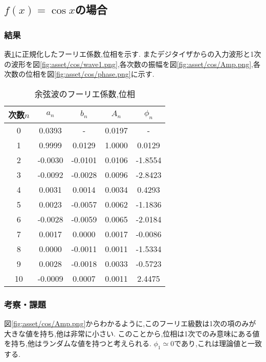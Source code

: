 \subsection{$f(x)=\cos x$の場合}
\subsubsection{結果}
表\ref{tab:cos_res}に正規化したフーリエ係数,位相を示す.
またデジタイザからの入力波形と1次の波形を図\ref{fig:asset/cos/wave1.png},各次数の振幅を図\ref{fig:asset/cos/Amp.png},各次数の位相を図\ref{fig:asset/cos/phase.png}に示す.
\begin{table}[h]
   \caption{余弦波のフーリエ係数,位相}
   \label{tab:cos_res}
   \centering
   \begin{tabular}{ccccc}
     \hline
     次数$n$&$a_n$&$b_n$&$A_n$&$\phi_n$\\
     \hline \hline
     0 & 0.0393 & - & 0.0197 & - \\
1 & 0.9999 & 0.0129 & 1.0000 & 0.0129 \\
2 & -0.0030 & -0.0101 & 0.0106 & -1.8554 \\
3 & -0.0092 & -0.0028 & 0.0096 & -2.8423 \\
4 & 0.0031 & 0.0014 & 0.0034 & 0.4293 \\
5 & 0.0023 & -0.0057 & 0.0062 & -1.1836 \\
6 & -0.0028 & -0.0059 & 0.0065 & -2.0184 \\
7 & 0.0017 & 0.0000 & 0.0017 & -0.0086 \\
8 & 0.0000 & -0.0011 & 0.0011 & -1.5334 \\
9 & 0.0028 & -0.0018 & 0.0033 & -0.5723 \\
10 & -0.0009 & 0.0007 & 0.0011 & 2.4475\\
     \hline
   \end{tabular}
\end{table}
\begin{figure}[htbp]
  \begin{minipage}{0.5\hsize}
  \end{minipage}
  \begin{minipage}{0.5\hsize}
  \end{minipage} 
\end{figure}
\newpage
\subsubsection{考察・課題}
図\ref{fig:asset/cos/Amp.png}からわかるように,このフーリエ級数は1次の項のみが大きな値を持ち,他は非常に小さい.
このことから,位相は1次でのみ意味にある値を持ち,他はランダムな値を持つと考えられる. $\phi_1\simeq0$であり,これは理論値と一致する.